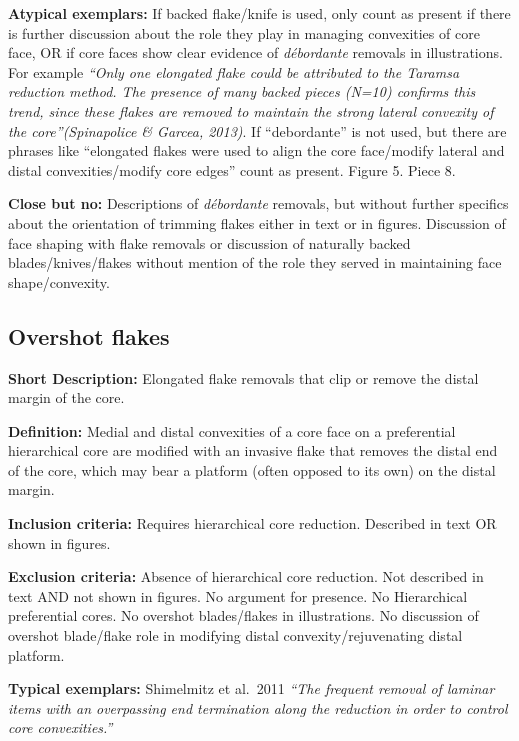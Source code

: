 \documentclass[
]{article}
\begin{document}
\textbf{Atypical exemplars:} If backed flake/knife is used, only count
as present if there is further discussion about the role they play in
managing convexities of core face, OR if core faces show clear evidence
of \emph{débordante} removals in illustrations. For example \emph{``Only
one elongated flake could be attributed to the Taramsa reduction method.
The presence of many backed pieces (N=10) confirms this trend, since
these flakes are removed to maintain the strong lateral convexity of the
core''(Spinapolice \& Garcea, 2013)}. If ``debordante'' is not used, but
there are phrases like ``elongated flakes were used to align the core
face/modify lateral and distal convexities/modify core edges'' count as
present. Figure 5. Piece 8.

\textbf{Close but no:} Descriptions of \emph{débordante} removals, but
without further specifics about the orientation of trimming flakes
either in text or in figures. Discussion of face shaping with flake
removals or discussion of naturally backed blades/knives/flakes without
mention of the role they served in maintaining face shape/convexity.

\subsection{Overshot flakes}\label{overshot-flakes}

\textbf{Short Description:} Elongated flake removals that clip or remove
the distal margin of the core.

\textbf{Definition:} Medial and distal convexities of a core face on a
preferential hierarchical core are modified with an invasive flake that
removes the distal end of the core, which may bear a platform (often
opposed to its own) on the distal margin.

\textbf{Inclusion criteria:} Requires hierarchical core reduction.
Described in text OR shown in figures.

\textbf{Exclusion criteria:} Absence of hierarchical core reduction. Not
described in text AND not shown in figures. No argument for presence. No
Hierarchical preferential cores. No overshot blades/flakes in
illustrations. No discussion of overshot blade/flake role in modifying
distal convexity/rejuvenating distal platform.

\textbf{Typical exemplars:} Shimelmitz et al.~2011 \emph{``The frequent
removal of laminar items with an overpassing end termination along the
reduction in order to control core convexities.''}
\end{document}
